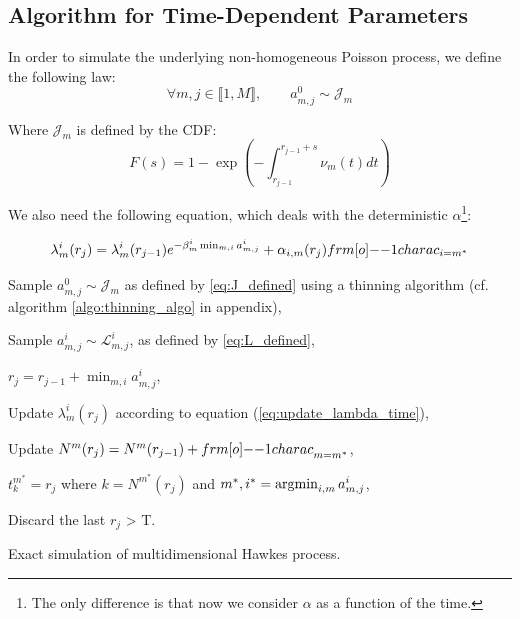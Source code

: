 \subsection{Algorithm for Time-Dependent Parameters}

In order to simulate the underlying non-homogeneous Poisson process, we define the following law:
$$ \forall m,j \in  \llbracket 1, M \rrbracket, \qquad a_{m,j}^0 \sim \mathcal J_m  $$

Where $\mathcal J_m $ is defined by the CDF:
\begin{equation}
\label{eq:J_defined}
F(s) = 1 - \exp \left ( - \int_{r_{j-1}}^{r_{j-1} + s } \nu_m (t) dt \right )
\end{equation}

We also need the following equation, which deals with the deterministic $\alpha$\footnote{The only difference is that now we consider $\alpha$ as a function of the time.}:

\begin{equation}
\lambda_m^i ( r_j ) = \lambda_m^i ( r_{j-1} )  e^{ - \beta_m^i \min_{m,i} a_{m,j}^i } + \alpha_{i,m} (r_j) \11charac_{i = m^*}
\label{eq:update_lambda_time} 
\end{equation}




\begin{algorithm}[H]
\label{algo:simul_hp_time}
\SetAlgoLined

			{ 
					{
						{Sample $a_{m,j}^0 \sim \mathcal J_{m} $ as defined by \ref{eq:J_defined} using a thinning algorithm (cf. algorithm \ref{algo:thinning_algo} in appendix),
						
							{Sample $a_{m,j}^i \sim  \mathcal L^i_{m,j} $, as defined by \ref{eq:L_defined},
							}
						}
						
						$r_j = r_{j-1} + \min_{m,i} a_{m,j}^i$,
						
							{Update $\lambda_m^i ( r_j )$ according to equation (\ref{eq:update_lambda_time}),
							
							Update $N^m ( r_j ) = N^m( r_{j-1} ) + {\11charac}_{m = m^*} $,}
					$t_k^{m^*} = r_j$ where $k = N^{m^*} ( r_j ) $ and $ m^*,i^* = \operatorname*{\arg\!\min}_{i,m} a_{m,j}^i $,
					}
			Discard the last $r_j$ > T.
			}
\caption{Exact simulation of multidimensional Hawkes process.}
\end{algorithm}


